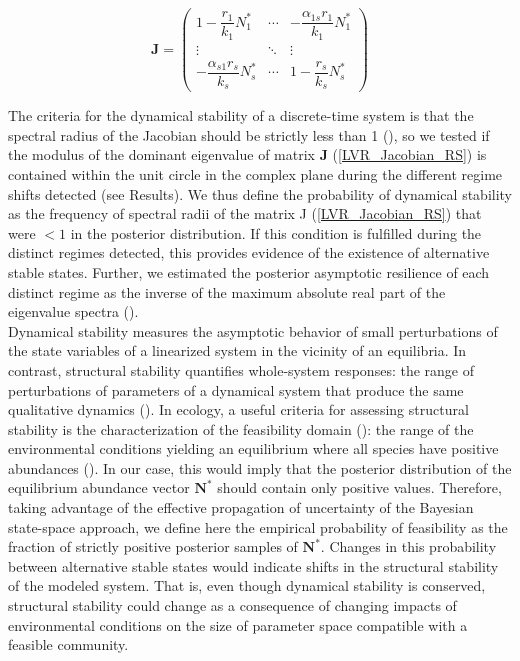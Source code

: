 \documentclass[12pt]{article}
\begin{document}
\begin{equation}\label{LVR_Jacobian_RS}
	\textbf{J} =
	\begin{pmatrix}
		1 - \dfrac{r_{1}}{k_{1}}{N}_{1}^* & \cdots & - \dfrac{\alpha_{1s}r_{1}}{k_{1}}{N}_{1}^*\\
		\vdots & \ddots & \vdots\\
		- \dfrac{\alpha_{s1}r_{s}}{k_{s}}{N}_{s}^* & \cdots & 1 - \dfrac{r_{s}}{k_{s}}{N}_{s}^*
	\end{pmatrix}
\end{equation}

The criteria for the dynamical stability of a discrete-time system is that the spectral radius of the Jacobian should be strictly less than 1 (\cite{Elaydi2005}), so we tested if the modulus of the dominant eigenvalue of matrix \textbf{J} (\ref{LVR_Jacobian_RS}) is contained within the unit circle in the complex plane during the different regime shifts detected (see Results). We thus define the probability of dynamical stability as the frequency of spectral radii of the matrix J (\ref{LVR_Jacobian_RS}) that were $ < 1 $ in the posterior distribution. If this condition is fulfilled during the distinct regimes detected, this provides evidence of the existence of alternative stable states. Further, we estimated the posterior asymptotic resilience of each distinct regime as the inverse of the maximum absolute real part of the eigenvalue spectra (\cite{Arnoldi2016a}). \\

Dynamical stability measures the asymptotic behavior of small perturbations of the state variables of a linearized system in the vicinity of an equilibria. In contrast, structural stability quantifies whole-system responses: the range of perturbations of parameters of a dynamical system that produce the same qualitative dynamics (\cite{Thom1977,Almaraz2023b}). In ecology, a useful criteria for assessing structural stability is the characterization of the feasibility domain (\cite{Logofet1993,Roberts1974}): the range of the environmental conditions yielding an equilibrium where all species have positive abundances (\cite{Song2017b}). In our case, this would imply that the posterior distribution of the equilibrium abundance vector $\mathbf{N}^*$ should contain only positive values. Therefore, taking advantage of the effective propagation of uncertainty of the Bayesian state-space approach, we define here the empirical probability of feasibility as the fraction of strictly positive posterior samples of $\mathbf{N}^*$. Changes in this probability between alternative stable states would indicate shifts in the structural stability of the modeled system. That is, even though dynamical stability is conserved, structural stability could change as a consequence of changing impacts of environmental conditions on the size of parameter space compatible with a feasible community.\\
\end{document}
